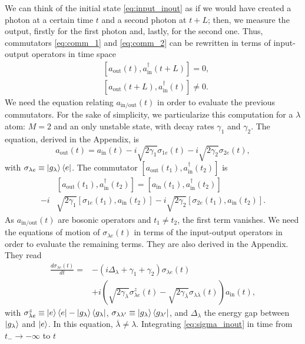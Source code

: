 \documentclass[aps,pra,reprint,amsmath,amssymb]{revtex4-1}
\begin{document}
We can think of the initial state \eqref{eq:input_inout} as if we would have created a photon at a certain time $t$ and a second photon at $t+L$; then, we measure the output, firstly for the first photon and, lastly, for the second one. Thus, commutators \eqref{eq:comm_1} and \eqref{eq:comm_2} can be rewritten in terms of input-output operators in time space \cite{Fan2010}
\begin{align}
\label{eq:comm_a_1}&[a_\text{out}(t),a_\text{in}^\dagger(t+L)]=0,\\
\label{eq:comm_a_2}&[a_\text{out}(t+L),a_\text{in}^\dagger(t)]\neq 0.
\end{align}
We need the equation relating $a_\text{in/out}(t)$ in order to evaluate the previous commutators. For the sake of simplicity, we particularize this computation for a $\lambda$ atom: $M=2$ and an only unstable state, with decay rates $\gamma_1$ and $\gamma_2$. The equation, derived in the Appendix, is
\begin{equation}
\label{eq:a_inout}a_\text{out}(t)=a_\text{in}(t) - i\sqrt{2\gamma_1}\sigma_{1e}(t)-i\sqrt{2\gamma_2}\sigma_{2e}(t),
\end{equation}
with $\sigma_{\lambda e}\equiv \ket{g_\lambda}\bra{e}$. The commutator $[a_\text{out}(t_1),a_\text{in}^\dagger(t_2)]$ is
\begin{align}\label{eq:comm_in_out}
&[a_\text{out}(t_1),a_\text{in}^\dagger(t_2)]=[a_\text{in}(t_1),a_\text{in}^\dagger(t_2)]\nonumber\\
-i&\sqrt{2\gamma_1}[\sigma_{1e}(t_1),a_\text{in}(t_2)]-i\sqrt{2\gamma_2}[\sigma_{2e}(t_1),a_\text{in}(t_2)].
\end{align}
As $a_\text{in/out}(t)$ are bosonic operators \cite{Fan2010} and $t_1\neq t_2$, the first term vanishes. We need the equations of motion of $\sigma_{\lambda e}(t)$ in terms of the input-output operators in order to evaluate the remaining terms. They are also derived in the Appendix. They read
\begin{align}
\label{eq:sigma_inout}\frac{d\sigma_{\lambda e}(t)}{dt}=&-(i\Delta_\lambda+\gamma_1+\gamma_2)\sigma_{\lambda e}(t)\nonumber\\
&+i\left(\sqrt{2\gamma_\lambda}\sigma_{\lambda e}^z(t)-\sqrt{2\gamma_{\overline{\lambda}}}\sigma_{\lambda \overline{\lambda}}(t)\right)a_\text{in}(t),
\end{align}
with $\sigma_{\lambda e}^z\equiv \ket{e}\bra{e}-\ket{g_\lambda}\bra{g_\lambda}$, $\sigma_{\lambda\lambda'}\equiv \ket{g_\lambda}\bra{g_{\lambda'}}$, and $\Delta_\lambda$ the energy gap between $\ket{g_\lambda}$ and $\ket{e}$. In this equation, $\overline{\lambda}\neq \lambda$. Integrating \eqref{eq:sigma_inout} in time from $t_-\to-\infty$ to $t$
\end{document}
